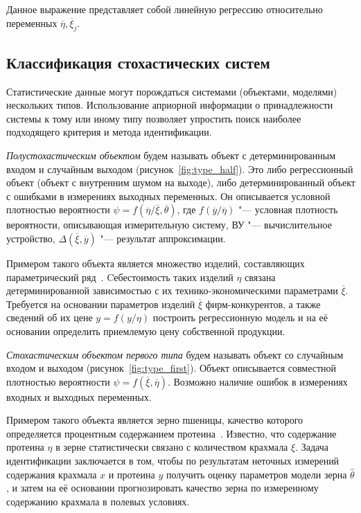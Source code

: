 Данное выражение представляет собой линейную регрессию относительно переменных
\( \overline{\eta}, \overline{\xi}_j \).

\subsection{Классификация стохастических систем}\label{subsec:classification}

Статистические данные могут порождаться системами (объектами, моделями) нескольких типов.
Использование априорной информации о принадлежности системы к тому или иному типу
позволяет упростить поиск наиболее подходящего критерия и метода идентификации.

\emph{Полустохастическим объектом} будем называть объект с детерминированным входом и
случайным выходом (рисунок~\ref{fig:type_half}).
Это либо регрессионный объект (объект с внутренним шумом на выходе),
либо детерминированный объект с ошибками в измерениях выходных переменных.
Он описывается условной плотностью вероятности
\( \psi = f(\overline{\eta} / \overline{\xi}, \overline{\theta}) \),
где \( f(\overline{y} / \overline{\eta}) \)
"--- условная плотность вероятности, описывающая измерительную систему,
ВУ "--- вычислительное устройство,
\( \Delta(\overline{\xi}, \overline{y}) \) "--- результат аппроксимации.

Примером такого объекта является множество изделий, составляющих параметрический ряд~\cite{kruchkova02}.
Cебестоимость таких изделий \( \eta \) связана детерминированной зависимостью с
их технико-экономическими параметрами \( \overline{\xi} \).
Требуется на основании параметров изделий \( \overline{\xi} \) фирм-конкурентов,
а также сведений об их цене \( y = f(y / \eta) \) построить регрессионную модель и на её основании
определить приемлемую цену собственной продукции.

\emph{Стохастическим объектом первого типа} будем называть объект со случайным входом и выходом
(рисунок~\ref{fig:type_first}).
Объект описывается совместной плотностью вероятности \( \psi = f(\overline{\xi}, \overline{\eta}) \).
Возможно наличие ошибок в измерениях входных и выходных переменных.

Примером такого объекта является зерно пшеницы,
качество которого определяется процентным содержанием протеина~\cite{ezekiel41}.
Известно, что содержание протеина \( \eta \) в зерне статистически связано с
количеством крахмала \( \xi \).
Задача идентификации заключается в том, чтобы по результатам неточных измерений содержания
крахмала \( x \) и протеина \( y \) получить оценку параметров модели зерна \( \hat{\theta} \),
и затем на её основании прогнозировать качество зерна по измеренному содержанию крахмала в
полевых условиях.

